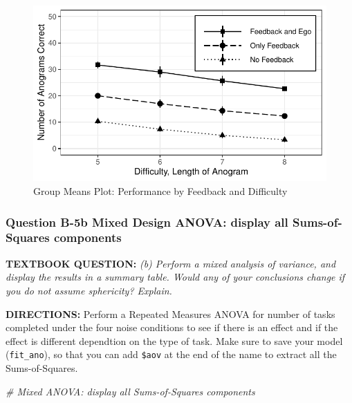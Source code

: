 \documentclass[
]{article}
\newenvironment{Shaded}{\begin{snugshade}}{\end{snugshade}}
\newcommand{\CommentTok}[1]{\textcolor[rgb]{0.56,0.35,0.01}{\textit{#1}}}
\begin{document}
\begin{figure}

{\centering \includegraphics{Chapter-16-Assignment-R-Skeleton_files/figure-latex/unnamed-chunk-13-1} 

}

\caption{Group Means Plot: Performance by Feedback and Difficulty}\label{fig:unnamed-chunk-13}
\end{figure}

\clearpage

\hypertarget{question-b-5b-mixed-design-anova-display-all-sums-of-squares-components}{%
\subsubsection{Question B-5b Mixed Design ANOVA: display all
Sums-of-Squares
components}\label{question-b-5b-mixed-design-anova-display-all-sums-of-squares-components}}

\textbf{TEXTBOOK QUESTION:} \emph{(b) Perform a mixed analysis of
variance, and display the results in a summary table. Would any of your
conclusions change if you do not assume sphericity? Explain.}

\textbf{DIRECTIONS:} Perform a Repeated Measures ANOVA for number of
tasks completed under the four noise conditions to see if there is an
effect and if the effect is different dependtion on the type of task.
Make sure to save your model (\texttt{fit\_ano}), so that you can add
\texttt{\$aov} at the end of the name to extract all the
Sums-of-Squares.

\begin{Shaded}
\begin{Highlighting}[]
\CommentTok{# Mixed ANOVA: display all Sums-of-Squares components}
\end{Highlighting}
\end{Shaded}
\end{document}
